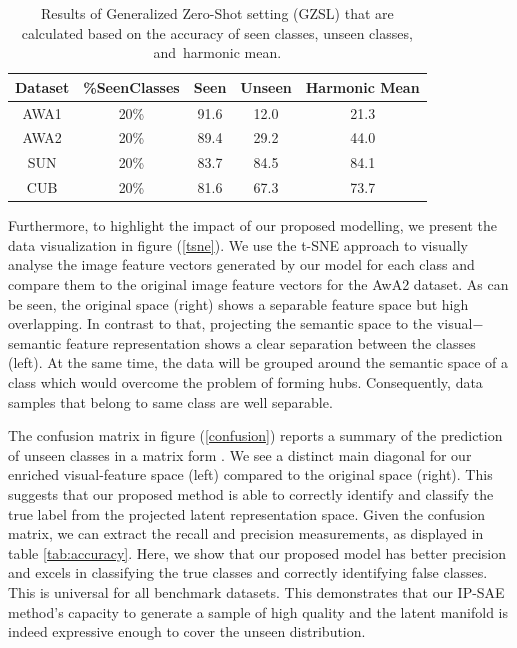 \documentclass{article}
\begin{document}
\begin{table}[h]
  \centering
  \footnotesize
  \caption{Results of Generalized Zero-Shot setting (GZSL) that are calculated based on the accuracy of seen classes, unseen classes, and~harmonic mean.}
  \footnotesize
  \begin{tabular}{|c|cccc|}
    \hline
\textbf{Dataset}	& \textbf{\%SeenClasses}	 & \textbf{Seen} & \textbf{Unseen}  & \textbf{Harmonic Mean}\\
    \hline
AWA1 & 20\% & 91.6 & 12.0 & 21.3\\
AWA2 & 20\% & 89.4  & 29.2 & 44.0\\
SUN &  20\% & 83.7  & 84.5 & 84.1\\
CUB &  20\% & 81.6  & 67.3& 73.7\\
    \hline
  \end{tabular}
  \label{tab:example33}
\end{table}

Furthermore, to highlight the impact of our proposed modelling, we present the data visualization in figure (\ref{tsne}). We use the t-SNE \cite{b59} approach to visually analyse the image feature vectors generated by our model for each class and compare them to the original image feature vectors for the AwA2 dataset. As can be seen, the original space (right) shows a separable feature space but high overlapping. In contrast to that, projecting the semantic space to the visual$-$semantic feature representation shows a clear separation between the classes (left). At the same time, the data will be grouped around the semantic space of a class which would overcome the problem of forming hubs. Consequently, data samples that belong to same class are well separable.

The confusion matrix in figure (\ref{confusion}) reports a summary of the prediction of unseen classes in a matrix form \cite{b74}. We see a distinct main diagonal for our enriched visual-feature space (left) compared to the original space (right). This suggests that our proposed method is able to correctly identify and classify the true label from the projected latent representation space. Given the confusion matrix, we can extract the recall and precision measurements, as displayed in table \ref{tab:accuracy}. Here, we show that our proposed model has better precision and excels in classifying the true classes and correctly identifying false classes. This is universal for all benchmark datasets. This demonstrates that our IP-SAE method's capacity to generate a sample of high quality and the latent manifold is indeed expressive enough to cover the unseen distribution.
\end{document}
